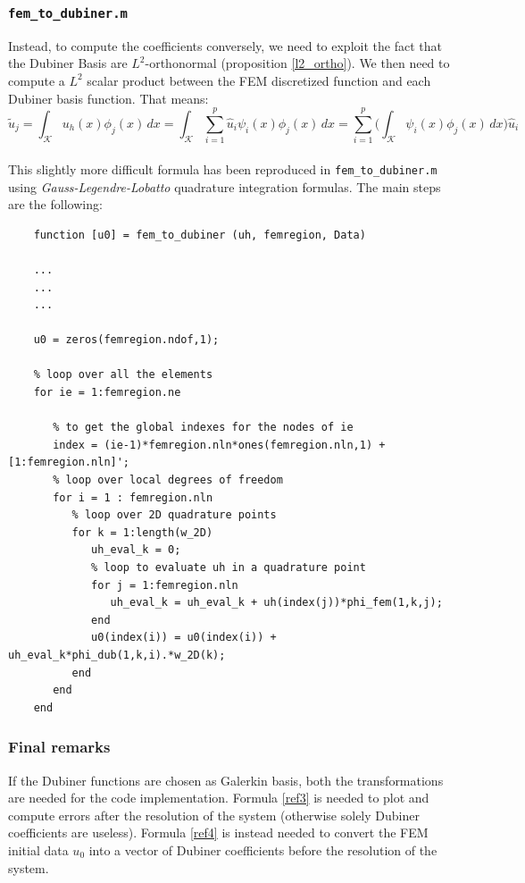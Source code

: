 \documentclass[a4paper,11pt]{article}
\begin{document}
	\subsubsection{\texttt{fem\_to\_dubiner.m}}
	\noindent Instead, to compute the coefficients conversely, we need to exploit the fact that the Dubiner Basis are $L^2$-orthonormal (proposition \ref{l2_ortho}). We then need to compute a $L^2$ scalar product between the FEM discretized function and each Dubiner basis function. That means:
	\begin{equation}\label{ref4}
	\tilde{u}_j = \int_\mathcal{K} u_h(x) \phi_j(x) \,dx = \int_{\mathcal{K}} \sum_{i=1}^p \hat{u}_i\psi_i(x) \phi_j(x) \,dx = \sum_{i=1}^p \Big(\int_{\mathcal{K}}\psi_i(x)\phi_j(x)\,dx \Big) \hat{u}_i
	\end{equation}
	\vspace{2mm} \\
	\noindent This slightly more difficult formula has been reproduced in \texttt{fem\_to\_dubiner.m} using \emph{Gauss-Legendre-Lobatto} quadrature integration formulas. The main steps are the following:
	\begin{verbatim}
	function [u0] = fem_to_dubiner (uh, femregion, Data)
	
	...
	...
	...
	
	u0 = zeros(femregion.ndof,1);
	
	% loop over all the elements
	for ie = 1:femregion.ne
	
	   % to get the global indexes for the nodes of ie 
	   index = (ie-1)*femregion.nln*ones(femregion.nln,1) + [1:femregion.nln]';
	   % loop over local degrees of freedom
	   for i = 1 : femregion.nln
	      % loop over 2D quadrature points
	      for k = 1:length(w_2D) 
	         uh_eval_k = 0;
	         % loop to evaluate uh in a quadrature point
	         for j = 1:femregion.nln
	            uh_eval_k = uh_eval_k + uh(index(j))*phi_fem(1,k,j);
	         end
	         u0(index(i)) = u0(index(i)) + uh_eval_k*phi_dub(1,k,i).*w_2D(k);
	      end
	   end    
	end
	\end{verbatim}
	
	\vspace{5mm}
	\subsubsection{Final remarks}
	\noindent If the Dubiner functions are chosen as Galerkin basis, both the transformations are needed for the code implementation. Formula \ref{ref3} is needed to plot and compute errors after the resolution of the system (otherwise solely Dubiner coefficients are useless). Formula \ref{ref4} is instead needed to convert the FEM initial data $u_0$ into a vector of Dubiner coefficients before the resolution of the system.\\
	
\end{document}
